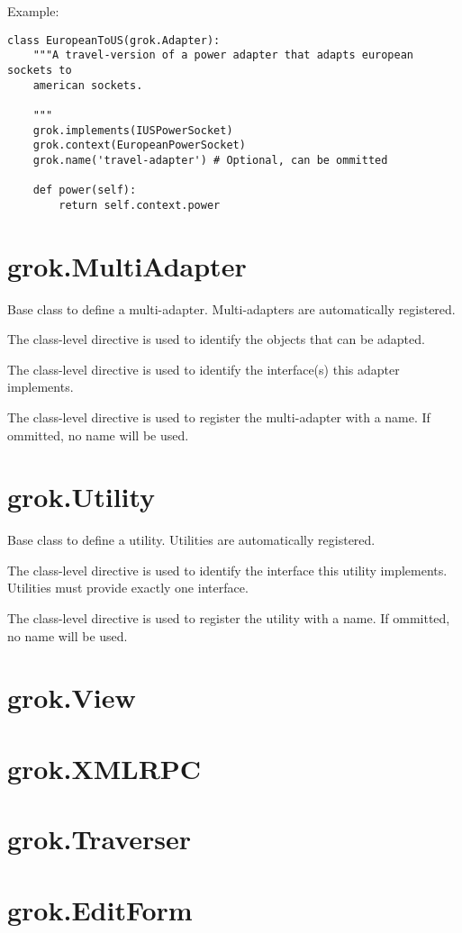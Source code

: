     \begin{bf}Example:\end{bf}

    \begin{verbatim}
class EuropeanToUS(grok.Adapter):
    """A travel-version of a power adapter that adapts european sockets to
    american sockets.
    
    """
    grok.implements(IUSPowerSocket)
    grok.context(EuropeanPowerSocket)
    grok.name('travel-adapter') # Optional, can be ommitted

    def power(self):
        return self.context.power
    \end{verbatim}

\section{grok.MultiAdapter}

    Base class to define a multi-adapter. Multi-adapters are automatically
    registered.

    The class-level directive  is used to identify
    the objects that can be adapted.

    The class-level directive  is used to identify
    the interface(s) this adapter implements.

    The class-level directive  is used to register the
    multi-adapter with a name. If ommitted, no name will be used.

\section{grok.Utility}

    Base class to define a utility. Utilities are automatically registered.

    The class-level directive  is used to identify
    the interface this utility implements. Utilities must provide exactly one
    interface.

    The class-level directive  is used to register the
    utility with a name. If ommitted, no name will be used.

\section{grok.View}

\section{grok.XMLRPC}

\section{grok.Traverser}

\section{grok.EditForm}
